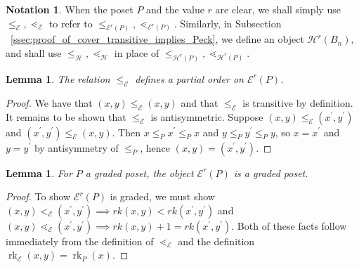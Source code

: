 \documentclass[10 pt]{amsart}
\theoremstyle{plain}
\newtheorem{lem}[thm]{Lemma}
\theoremstyle{definition}
\newtheorem{note}[thm]{Notation}
\theoremstyle{remark}
\numberwithin{equation}{section}
\newcommand\rk{\operatorname{rk}}
\begin{document}
\begin{note}
When the poset $P$ and the value $r$ are clear, we shall simply use $\leq_{\mathcal E},\lessdot_{\mathcal E}$ to refer to $\leq_{\mathcal E^r(P)},\lessdot_{\mathcal E^r(P)}.$ Similarly, in Subsection ~\ref{ssec:proof_of_cover_transitive_implies_Peck}, we define an object $\mathcal H^r(B_n),$ and shall use $\leq_{\mathcal H},\lessdot_{\mathcal H}$ in place of $\leq_{\mathcal H^r(P)},\lessdot_{\mathcal H^r(P)}.$
\end{note}

\begin{lem}\label{lem:f_partial_order}
The relation $\le_{\mathcal E}$ defines a partial order on $\mathcal E^r(P)$.
\end{lem}

\begin{proof}
We have that $(x, y)\le_{\mathcal E} (x, y)$ and that $\le_{\mathcal E}$ is transitive by definition.  It remains to be shown that $\le_{\mathcal E}$ is antisymmetric.  Suppose $(x, y)\le_{\mathcal E} (x^\prime, y^\prime)$ and $(x^\prime, y^\prime)\le_{\mathcal E} (x, y)$.  Then $x\le_P x^\prime \le_P x$ and $y\le_P y^\prime \le_P y$, so $x = x^\prime$ and $y=y^\prime$ by antisymmetry of $\le_P$, hence $(x, y) = (x^\prime, y^\prime)$.
\end{proof}


\begin{lem}\label{lem:FP_graded_poset}
For $P$ a graded poset, the object $\mathcal E^r(P)$ is a graded poset.
\end{lem}

\begin{proof}
To show $\mathcal E^r(P)$ is graded, we must show $(x, y) <_{\mathcal E} (x^\prime, y^\prime) \implies rk(x, y)<rk(x^\prime, y^\prime)$ and $(x, y) \lessdot_{\mathcal E} (x^\prime, y^\prime) \implies rk(x, y)+1 = rk(x^\prime , y^\prime)$.  Both of these facts follow immediately from the definition of $\lessdot_{\mathcal E}$ and the definition $\rk_{\mathcal E}(x, y) = \rk_P(x)$.

\end{proof}
\end{document}
